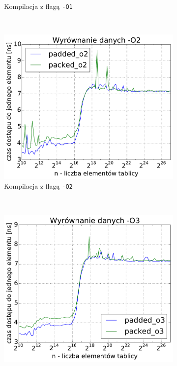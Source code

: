 \begin{figure}[!h]
\begin{subfigure}[c]{0.45\textwidth}
        \caption{Kompilacja z flagą \texttt{-O1}}
    \end{subfigure}
    \\
    \begin{subfigure}[c]{0.45\textwidth}
        \centering
        \includegraphics[width=\textwidth]{images/benchs_xeon/data_alignment_O2}
        \caption{Kompilacja z flagą \texttt{-O2}}
    \end{subfigure}
    ~
    \begin{subfigure}[c]{0.45\textwidth}
        \centering
        \includegraphics[width=\textwidth]{images/benchs_xeon/data_alignment_O3}

\end{subfigure}
\end{figure}
